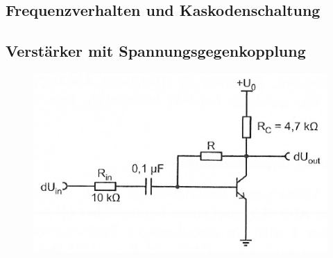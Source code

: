 \subsection{Frequenzverhalten und Kaskodenschaltung}

\fehlt

\subsection{Verstärker mit Spannungsgegenkopplung}

\fehlt

\begin{figure}[htbp]
	\centering
	\includegraphics[width=.6\textwidth]{Anleitung/4-1.png}
	\caption{
		\cite[Abbildung~4.1]{physik313-Anleitung}
	}
	\label{fig:4-1}
\end{figure}


\FloatBarrier
\IfFileExists{\bibliographyfile}{
	
}{}



